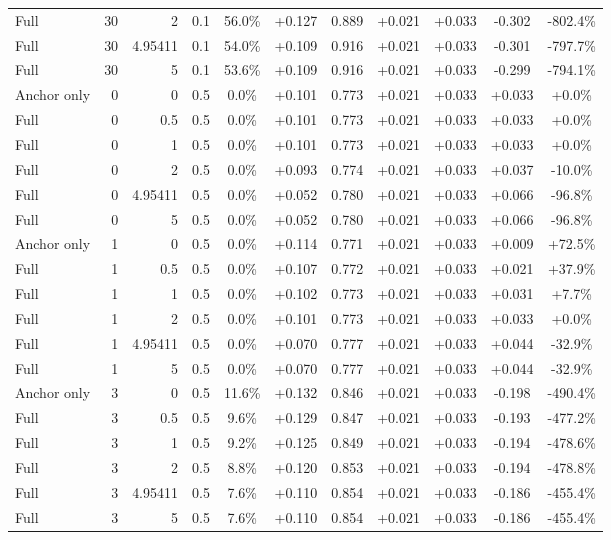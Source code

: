 \begin{table}[htbp]
\begin{tabular}{lrrrccccccc}
Full & 30 & 2 & 0.1 & 56.0\% & +0.127 & 0.889 & +0.021 & +0.033 & -0.302 & -802.4\% \\
Full & 30 & 4.95411 & 0.1 & 54.0\% & +0.109 & 0.916 & +0.021 & +0.033 & -0.301 & -797.7\% \\
Full & 30 & 5 & 0.1 & 53.6\% & +0.109 & 0.916 & +0.021 & +0.033 & -0.299 & -794.1\% \\
Anchor only & 0 & 0 & 0.5 & 0.0\% & +0.101 & 0.773 & +0.021 & +0.033 & +0.033 & +0.0\% \\
Full & 0 & 0.5 & 0.5 & 0.0\% & +0.101 & 0.773 & +0.021 & +0.033 & +0.033 & +0.0\% \\
Full & 0 & 1 & 0.5 & 0.0\% & +0.101 & 0.773 & +0.021 & +0.033 & +0.033 & +0.0\% \\
Full & 0 & 2 & 0.5 & 0.0\% & +0.093 & 0.774 & +0.021 & +0.033 & +0.037 & -10.0\% \\
Full & 0 & 4.95411 & 0.5 & 0.0\% & +0.052 & 0.780 & +0.021 & +0.033 & +0.066 & -96.8\% \\
Full & 0 & 5 & 0.5 & 0.0\% & +0.052 & 0.780 & +0.021 & +0.033 & +0.066 & -96.8\% \\
Anchor only & 1 & 0 & 0.5 & 0.0\% & +0.114 & 0.771 & +0.021 & +0.033 & +0.009 & +72.5\% \\
Full & 1 & 0.5 & 0.5 & 0.0\% & +0.107 & 0.772 & +0.021 & +0.033 & +0.021 & +37.9\% \\
Full & 1 & 1 & 0.5 & 0.0\% & +0.102 & 0.773 & +0.021 & +0.033 & +0.031 & +7.7\% \\
Full & 1 & 2 & 0.5 & 0.0\% & +0.101 & 0.773 & +0.021 & +0.033 & +0.033 & +0.0\% \\
Full & 1 & 4.95411 & 0.5 & 0.0\% & +0.070 & 0.777 & +0.021 & +0.033 & +0.044 & -32.9\% \\
Full & 1 & 5 & 0.5 & 0.0\% & +0.070 & 0.777 & +0.021 & +0.033 & +0.044 & -32.9\% \\
Anchor only & 3 & 0 & 0.5 & 11.6\% & +0.132 & 0.846 & +0.021 & +0.033 & -0.198 & -490.4\% \\
Full & 3 & 0.5 & 0.5 & 9.6\% & +0.129 & 0.847 & +0.021 & +0.033 & -0.193 & -477.2\% \\
Full & 3 & 1 & 0.5 & 9.2\% & +0.125 & 0.849 & +0.021 & +0.033 & -0.194 & -478.6\% \\
Full & 3 & 2 & 0.5 & 8.8\% & +0.120 & 0.853 & +0.021 & +0.033 & -0.194 & -478.8\% \\
Full & 3 & 4.95411 & 0.5 & 7.6\% & +0.110 & 0.854 & +0.021 & +0.033 & -0.186 & -455.4\% \\
Full & 3 & 5 & 0.5 & 7.6\% & +0.110 & 0.854 & +0.021 & +0.033 & -0.186 & -455.4\% \\

\end{tabular}
\end{table}
